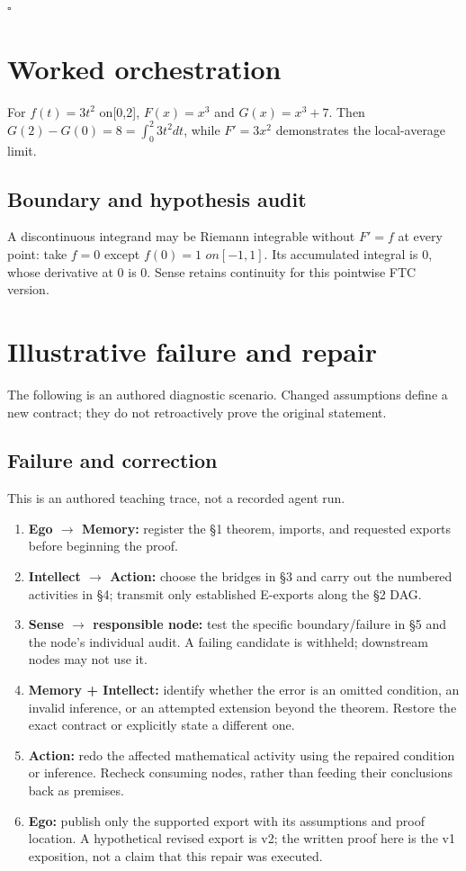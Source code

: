 \documentclass[preprint,12pt,aps,pra,showkeys,amsmath,amssymb,superscriptaddress,floatfix]{revtex4-2}
\theoremstyle{definition}
\theoremstyle{remark}
\providecommand{\tightlist}{\setlength{\itemsep}{2pt}\setlength{\parskip}{0pt}}
\begin{document}
\hfill$\square$

\section{Worked orchestration}

For \(f(t)=3t^{2}\) on{[}0,2{]}, \(F(x)=x^{3}\) and \(G(x)=x^{3}+7\).
Then \(G(2)-G(0)=8=\int _{0}^{2}3t^{2}dt\), while \(F'=3x^{2}\)
demonstrates the local-average limit.

\subsection{Boundary and hypothesis audit}

A discontinuous integrand may be Riemann integrable without \(F'=f\) at
every point: take \(f=0\) except \(f(0)=1\) \(on[-1,1]\). Its
accumulated integral is 0, whose derivative at 0 is 0. Sense retains
continuity for this pointwise FTC version.

\section{Illustrative failure and repair}

The following is an authored diagnostic scenario. Changed assumptions
define a new contract; they do not retroactively prove the original
statement.

\subsection{Failure and correction}
This is an authored teaching trace, not a recorded agent run.

\begin{enumerate}
\def\labelenumi{\arabic{enumi}.}
\tightlist
\item
  \textbf{Ego \(\to\) Memory:} register the §1 theorem, imports, and
  requested exports before beginning the proof.
\item
  \textbf{Intellect \(\to\) Action:} choose the bridges in §3 and carry
  out the numbered activities in §4; transmit only established E-exports
  along the §2 DAG.
\item
  \textbf{Sense \(\to\) responsible node:} test the specific
  boundary/failure in §5 and the node's individual audit. A failing
  candidate is withheld; downstream nodes may not use it.
\item
  \textbf{Memory + Intellect:} identify whether the error is an omitted
  condition, an invalid inference, or an attempted extension beyond the
  theorem. Restore the exact contract or explicitly state a different
  one.
\item
  \textbf{Action:} redo the affected mathematical activity using the
  repaired condition or inference. Recheck consuming nodes, rather than
  feeding their conclusions back as premises.
\item
  \textbf{Ego:} publish only the supported export with its assumptions
  and proof location. A hypothetical revised export is v2; the written
  proof here is the v1 exposition, not a claim that this repair was
  executed.
\end{enumerate}
\end{document}
